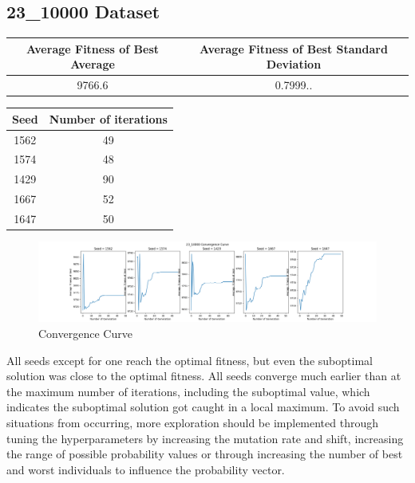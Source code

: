 \documentclass{article}
\begin{document}
\subsection*{23\_10000 Dataset}
\begin{center}
	\begin{tabular}{|c|c|}
		\hline
		Average Fitness of Best Average & Average Fitness of Best Standard Deviation \\
		\hline
		9766.6 & 0.7999.. \\
		\hline
	\end{tabular}
\end{center}

\begin{center}
	\begin{tabular}{|c|c|}
		\hline
		Seed & Number of iterations \\
		\hline
		1562 & 49 \\
		\hline
		1574 & 48 \\
		\hline
		1429 & 90 \\
		\hline
		1667 & 52 \\
		\hline
		1647 & 50 \\
		\hline
	\end{tabular}
\end{center}

\begin{figure}[h!]
	\centering
	\includegraphics[width=\linewidth]{knapsack_23_10000.png}
	\caption{Convergence Curve}
\end{figure}

All seeds except for one reach the optimal fitness, but even the suboptimal solution was close to the optimal fitness. All seeds converge much earlier than at the maximum number of iterations, including the suboptimal value, which indicates the suboptimal solution got caught in a local maximum. To avoid such situations from occurring, more exploration should be implemented through tuning the hyperparameters by increasing the mutation rate and shift, increasing the range of possible probability values or through increasing the number of best and worst individuals to influence the probability vector. \par
\end{document}
